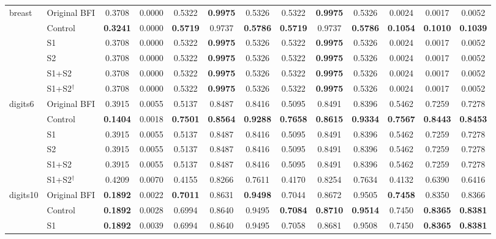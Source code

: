 \begin{table}[!t]
\begin{tabular}{llccccccccccc}
\midrule
\multirow{6}{*}{breast} & Original BFI & 0.3708 & 0.0000 & 0.5322 & \textbf{0.9975} & 0.5326 & 0.5322 & \textbf{0.9975} & 0.5326 & 0.0024 & 0.0017 & 0.0052 \\
 & Control & \textbf{0.3241} & 0.0000 & \textbf{0.5719} & 0.9737 & \textbf{0.5786} & \textbf{0.5719} & 0.9737 & \textbf{0.5786} & \textbf{0.1054} & \textbf{0.1010} & \textbf{0.1039} \\
 & S1 & 0.3708 & 0.0000 & 0.5322 & \textbf{0.9975} & 0.5326 & 0.5322 & \textbf{0.9975} & 0.5326 & 0.0024 & 0.0017 & 0.0052 \\
 & S2 & 0.3708 & 0.0000 & 0.5322 & \textbf{0.9975} & 0.5326 & 0.5322 & \textbf{0.9975} & 0.5326 & 0.0024 & 0.0017 & 0.0052 \\
 & S1+S2 & 0.3708 & 0.0000 & 0.5322 & \textbf{0.9975} & 0.5326 & 0.5322 & \textbf{0.9975} & 0.5326 & 0.0024 & 0.0017 & 0.0052 \\
 & S1+S2$^{\dagger}$ & 0.3708 & 0.0000 & 0.5322 & \textbf{0.9975} & 0.5326 & 0.5322 & \textbf{0.9975} & 0.5326 & 0.0024 & 0.0017 & 0.0052 \\
\midrule
\multirow{6}{*}{digits6} & Original BFI & 0.3915 & 0.0055 & 0.5137 & 0.8487 & 0.8416 & 0.5095 & 0.8491 & 0.8396 & 0.5462 & 0.7259 & 0.7278 \\
 & Control & \textbf{0.1404} & 0.0018 & \textbf{0.7501} & \textbf{0.8564} & \textbf{0.9288} & \textbf{0.7658} & \textbf{0.8615} & \textbf{0.9334} & \textbf{0.7567} & \textbf{0.8443} & \textbf{0.8453} \\
 & S1 & 0.3915 & 0.0055 & 0.5137 & 0.8487 & 0.8416 & 0.5095 & 0.8491 & 0.8396 & 0.5462 & 0.7259 & 0.7278 \\
 & S2 & 0.3915 & 0.0055 & 0.5137 & 0.8487 & 0.8416 & 0.5095 & 0.8491 & 0.8396 & 0.5462 & 0.7259 & 0.7278 \\
 & S1+S2 & 0.3915 & 0.0055 & 0.5137 & 0.8487 & 0.8416 & 0.5095 & 0.8491 & 0.8396 & 0.5462 & 0.7259 & 0.7278 \\
 & S1+S2$^{\dagger}$ & 0.4209 & 0.0070 & 0.4155 & 0.8266 & 0.7611 & 0.4170 & 0.8254 & 0.7634 & 0.4132 & 0.6390 & 0.6416 \\
\midrule
\multirow{6}{*}{digits10} & Original BFI & \textbf{0.1892} & 0.0022 & \textbf{0.7011} & 0.8631 & \textbf{0.9498} & 0.7044 & 0.8672 & 0.9505 & \textbf{0.7458} & 0.8350 & 0.8366 \\
 & Control & \textbf{0.1892} & 0.0028 & 0.6994 & 0.8640 & 0.9495 & \textbf{0.7084} & \textbf{0.8710} & \textbf{0.9514} & 0.7450 & \textbf{0.8365} & \textbf{0.8381} \\
 & S1 & \textbf{0.1892} & 0.0039 & 0.6994 & 0.8640 & 0.9495 & 0.7058 & 0.8681 & 0.9508 & 0.7450 & \textbf{0.8365} & \textbf{0.8381} \\

\end{tabular}
\end{table}
